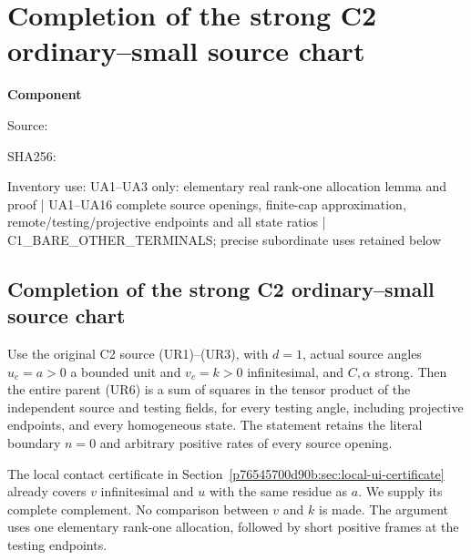 \chapter{Completion of the strong C2 ordinary--small source chart}
\label{component:p6b22e944bd7c}
\noindent\textbf{Component }\par
{\small\noindent Source: \par}
{\small\noindent SHA256: \par}
{\small\noindent Inventory use: UA1--UA3 only: elementary real rank-one allocation lemma and proof | UA1--UA16 complete source openings, finite-cap approximation, remote/testing/projective endpoints and all state ratios | C1\_\allowbreak{}BARE\_\allowbreak{}OTHER\_\allowbreak{}TERMINALS; precise subordinate uses retained below\par}
\medskip
\section{Completion of the strong C2 ordinary--small source chart}
\label{p6b22e944bd7c:sec:ui-all-tests-recovered}

\begin{theorem}
Use the original C2 source (UR1)--(UR3), with $d=1$, actual source
angles $u_c=a>0$ a bounded unit and $v_c=k>0$ infinitesimal, and
$C,\alpha$ strong. Then the entire parent (UR6) is a sum of squares
in the tensor product of the independent source and testing fields,
for every testing angle, including projective endpoints, and every
homogeneous state. The statement retains the literal boundary $n=0$
and arbitrary positive rates of every source opening.
\end{theorem}

The local contact certificate in Section~\ref{p76545700d90b:sec:local-ui-certificate}
already covers $v$ infinitesimal and $u$ with the same residue as $a$.
We supply its complete complement. No comparison between $v$ and $k$
is made. The argument uses one elementary rank-one allocation, followed
by short positive frames at the testing endpoints.

